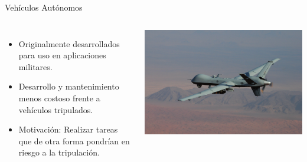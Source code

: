 \begin{frame}{Vehículos Autónomos}
	\begin{columns}
        \begin{itemize}
            \item Originalmente desarrollados para uso en aplicaciones militares.
            \item Desarrollo y mantenimiento menos costoso frente a vehículos tripulados.
            \item Motivación: Realizar tareas que de otra forma pondrían en riesgo a la tripulación.
        \end{itemize}
            \includegraphics[width=\textwidth]{img/dron_militar_1}
	\end{columns}
\end{frame}


